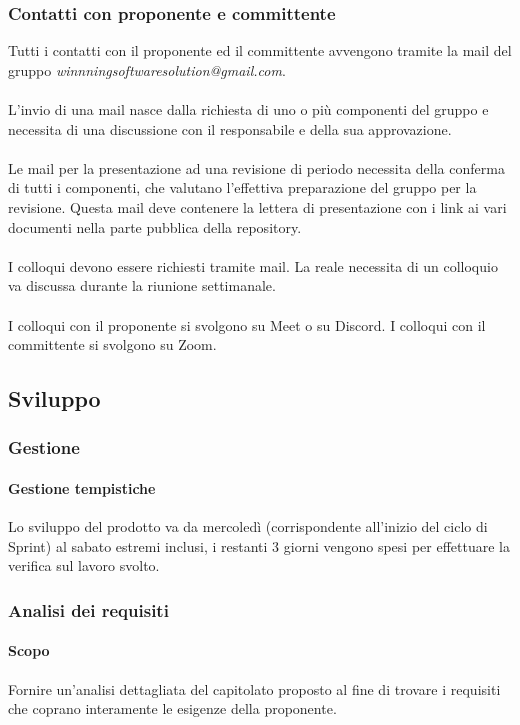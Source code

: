 \documentclass[a4paper, 12pt]{article}
\begin{document}
\subsubsection{Contatti con proponente e committente}

Tutti i contatti con il proponente ed il committente avvengono tramite la mail del gruppo \textit{winnningsoftwaresolution@gmail.com}.\\\\
L'invio di una mail nasce dalla richiesta di uno o più componenti del gruppo e necessita di una discussione con il responsabile e della sua approvazione.\\\\
Le mail per la presentazione ad una revisione di periodo necessita della conferma di tutti i componenti, che valutano l'effettiva preparazione del gruppo per la revisione. Questa mail deve contenere la lettera di presentazione con i link ai vari documenti nella parte pubblica della repository.\\\\
I colloqui devono essere richiesti tramite mail. La reale necessita di un colloquio va discussa durante la riunione settimanale.\\\\
I colloqui con il proponente si svolgono su Meet o su Discord. I colloqui con il committente si svolgono su Zoom.
\subsection{Sviluppo}\label{processi-primari-sviluppo}
\subsubsection{Gestione}
\paragraph{Gestione tempistiche}
Lo sviluppo del prodotto va da mercoledì (corrispondente all'inizio del ciclo di Sprint) al sabato estremi inclusi, i restanti 3 giorni vengono spesi per effettuare la verifica sul lavoro svolto.
\subsubsection{Analisi dei requisiti}
\paragraph{Scopo}
Fornire un'analisi dettagliata del capitolato proposto al fine di trovare i requisiti che coprano interamente le esigenze della proponente.
\end{document}
